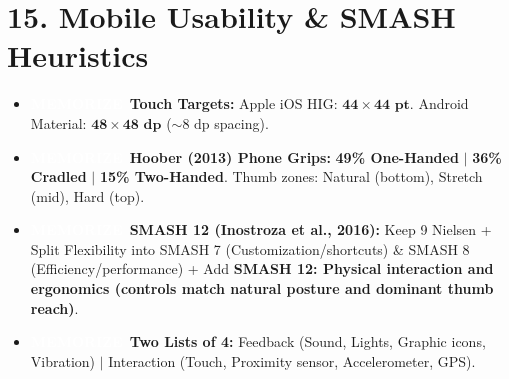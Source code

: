 \documentclass[8.5pt,a4paper,twocolumn]{article}
\newcommand{\tagmem}{\colorbox{accentred}{\textcolor{white}{\bfseries\fontsize{5.5pt}{6.5pt}\selectfont MEMORIZE}}\ }
\begin{document}
\section*{15. Mobile Usability \& SMASH Heuristics}
\begin{itemize}[leftmargin=7pt, itemsep=1pt, topsep=0.5pt]
    \item \tagmem \textbf{Touch Targets:} Apple iOS HIG: $\mathbf{44\times 44\text{ pt}}$. Android Material: $\mathbf{48\times 48\text{ dp}}$ ($\sim 8\text{ dp}$ spacing).
    \item \tagmem \textbf{Hoober (2013) Phone Grips:} \textbf{49\% One-Handed} $\vert$ \textbf{36\% Cradled} $\vert$ \textbf{15\% Two-Handed}. Thumb zones: Natural (bottom), Stretch (mid), Hard (top).
    \item \tagmem \textbf{SMASH 12 (Inostroza et al., 2016):} Keep 9 Nielsen + Split Flexibility into SMASH 7 (Customization/shortcuts) \& SMASH 8 (Efficiency/performance) + Add \textbf{SMASH 12: Physical interaction and ergonomics (controls match natural posture and dominant thumb reach)}.
    \item \tagmem \textbf{Two Lists of 4:} Feedback (Sound, Lights, Graphic icons, Vibration) $\vert$ Interaction (Touch, Proximity sensor, Accelerometer, GPS).
\end{itemize}

\newpage
\end{document}
